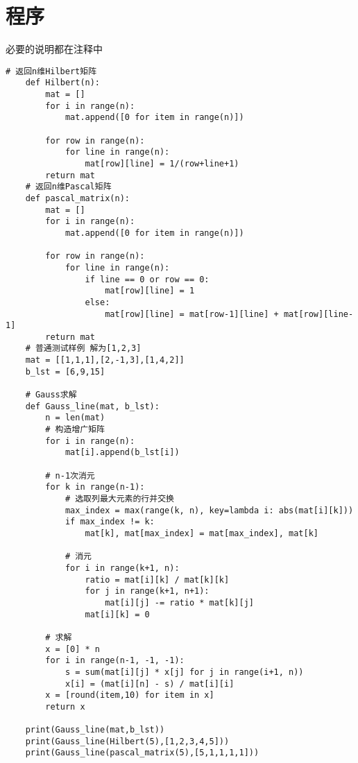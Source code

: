 \documentclass[12pt, a4paper, oneside]{ctexart}
\begin{document}
\section*{程序}
必要的说明都在注释中
\begin{multicols}{2}

\begin{lstlisting}[style = python]
    # 返回n维Hilbert矩阵
    def Hilbert(n):
        mat = []
        for i in range(n):
            mat.append([0 for item in range(n)])
    
        for row in range(n):
            for line in range(n):
                mat[row][line] = 1/(row+line+1)
        return mat
    # 返回n维Pascal矩阵
    def pascal_matrix(n):
        mat = []
        for i in range(n):
            mat.append([0 for item in range(n)])
            
        for row in range(n):
            for line in range(n):
                if line == 0 or row == 0:
                    mat[row][line] = 1
                else:
                    mat[row][line] = mat[row-1][line] + mat[row][line-1]
        return mat
    # 普通测试样例 解为[1,2,3]
    mat = [[1,1,1],[2,-1,3],[1,4,2]]
    b_lst = [6,9,15]
    
    # Gauss求解
    def Gauss_line(mat, b_lst):
        n = len(mat)
        # 构造增广矩阵
        for i in range(n):
            mat[i].append(b_lst[i])
    
        # n-1次消元
        for k in range(n-1):
            # 选取列最大元素的行并交换
            max_index = max(range(k, n), key=lambda i: abs(mat[i][k]))
            if max_index != k:
                mat[k], mat[max_index] = mat[max_index], mat[k]
    
            # 消元
            for i in range(k+1, n):
                ratio = mat[i][k] / mat[k][k]
                for j in range(k+1, n+1):
                    mat[i][j] -= ratio * mat[k][j]
                mat[i][k] = 0
    
        # 求解
        x = [0] * n
        for i in range(n-1, -1, -1):
            s = sum(mat[i][j] * x[j] for j in range(i+1, n))
            x[i] = (mat[i][n] - s) / mat[i][i]
        x = [round(item,10) for item in x]
        return x
    
    print(Gauss_line(mat,b_lst))
    print(Gauss_line(Hilbert(5),[1,2,3,4,5]))
    print(Gauss_line(pascal_matrix(5),[5,1,1,1,1]))
\end{lstlisting}
\end{multicols}  
\end{document}
